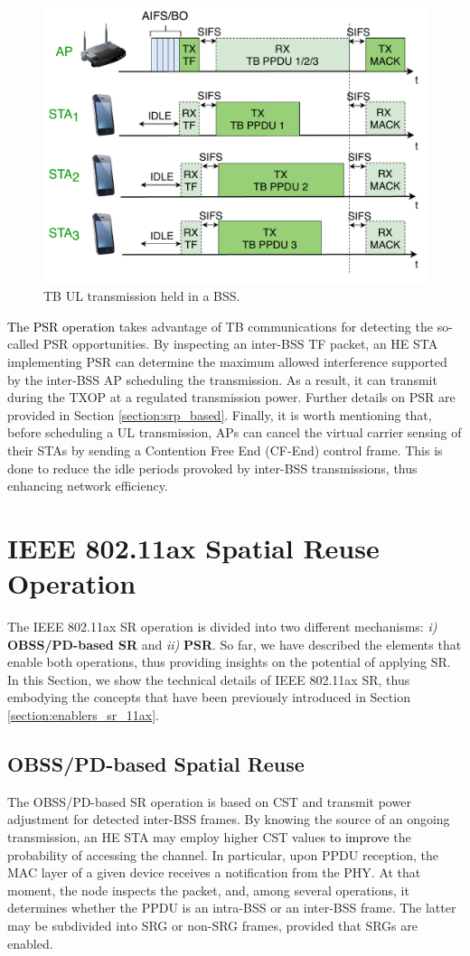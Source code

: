 \documentclass[preprint,12pt]{elsarticle}
\begin{document}
\begin{figure}[ht!]
	\centering
	\includegraphics[width=.5\columnwidth]{fig_8}
	\caption{TB UL transmission held in a BSS.}
	\label{fig:TB_transmission_example}
\end{figure}

\textcolor{black}{The PSR operation} takes advantage of TB communications for detecting the so-called PSR opportunities. By inspecting an inter-BSS TF packet, an HE STA implementing PSR can determine the maximum allowed interference supported by the inter-BSS AP scheduling the transmission. As a result, it can transmit during the TXOP at a regulated transmission power. Further details on PSR are provided in Section \ref{section:srp_based}. Finally, it is worth mentioning that, before scheduling a UL transmission, APs can cancel the virtual carrier sensing of their STAs by sending a Contention Free End (CF-End) control frame. This is done to reduce the idle periods provoked by inter-BSS transmissions, thus enhancing network efficiency. 


\section{IEEE 802.11ax Spatial Reuse Operation}
\label{section:operation_sr_11ax}
The IEEE 802.11ax SR operation is divided into two different mechanisms: \emph{i)} \textbf{OBSS/PD-based SR} and \emph{ii)} \textbf{PSR}. So far, we have described the elements that enable both operations, thus providing insights on the potential of applying SR. In this Section, we show the technical details of IEEE 802.11ax SR, thus embodying the concepts that have been previously introduced in Section \ref{section:enablers_sr_11ax}.

\subsection{OBSS/PD-based Spatial Reuse}
\label{section:obss_pd_based}
The OBSS/PD-based SR operation is based on CST and transmit power adjustment for detected inter-BSS frames. By knowing the source of an ongoing transmission, an HE STA may employ higher CST values \textcolor{black}{to improve} the probability of accessing the channel. In particular, upon PPDU reception, the MAC layer of a given device receives a notification from the PHY. At that moment, the node inspects the packet, and, among several operations, it determines whether the PPDU is an intra-BSS or an inter-BSS frame. The latter may be subdivided into SRG or non-SRG frames, provided that SRGs are enabled.
\end{document}
